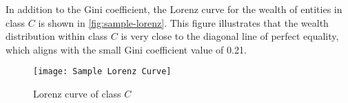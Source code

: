 In addition to the Gini coefficient, the Lorenz curve for the wealth of entities in class \(C\) is shown in \autoref{fig:sample-lorenz}. This figure illustrates that the wealth distribution within class \(C\) is very close to the diagonal line of perfect equality, which aligns with the small Gini coefficient value of 0.21.

\begin{figure}[!htbp]
    \centering
    \texttt{[image: Sample Lorenz Curve]}
    \caption{Lorenz curve of class \(C\)} \label{fig:sample-lorenz}
\end{figure}